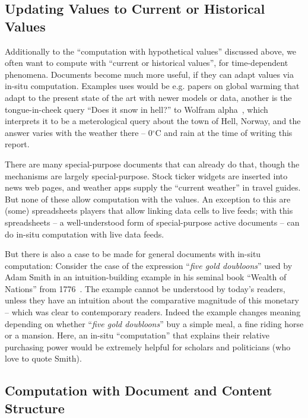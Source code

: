 \subsection{Updating Values to Current or Historical Values}\label{sec:ex:current}

Additionally to the ``computation with hypothetical values'' discussed above, we often
want to compute with ``current or historical values'', for time-dependent
phenomena. Documents become much more useful, if they can adapt values via in-situ
computation. Examples uses would be e.g. papers on global warming that adapt to the
present state of the art with newer models or data, another is the tongue-in-cheek query
``Does it snow in hell?'' to Wolfram alpha~\cite{WolframAlpha:on}, which interprets it to
be a meterological query about the town of Hell, Norway, and the answer varies with the
weather there -- 0$^\circ$C and rain at the time of writing this report. 

There are many special-purpose documents that can already do that, though the mechanisms
are largely special-purpose. Stock ticker widgets are inserted into news web pages, and
weather apps supply the ``current weather'' in travel guides. But none of these allow
computation with the values. An exception to this are (some) spreadsheets players that
allow linking data cells to live feeds; with this spreadsheets -- a well-understood form
of special-purpose active documents -- can do in-situ computation with live data feeds.

But there is also a case to be made for general documents with in-situ computation:
Consider the case of the expression ``\emph{five gold doubloons}'' used by Adam Smith in
an intuition-building example in his seminal book ``Wealth of Nations'' from
1776~\cite{Smith:WoN1776}. The example cannot be understood by today's readers, unless
they have an intuition about the comparative magnitude of this monetary -- which was clear
to contemporary readers. Indeed the example changes meaning depending on whether
``\emph{five gold doubloons}'' buy a simple meal, a fine riding horse or a mansion. Here,
an in-situ ``computation'' that explains their relative purchasing power would be
extremely helpful for scholars and politicians (who love to quote Smith).

\subsection{Computation with Document and Content Structure}\label{sec:ex:docstruct}

